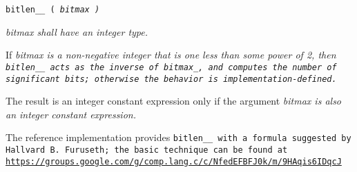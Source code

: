 
\tt{bitlen__ (} \it{bitmax} \tt{)}


\it{bitmax} shall have an integer type.


If \it{bitmax} is a non-negative integer that is one less than some power of 2,
then \tt{bitlen__} acts as the inverse of \tt{bitmax_}, and computes the number
of significant bits; otherwise the behavior is implementation-defined.

The result is an integer constant expression only if the
argument \it{bitmax} is also an integer constant expression.

\note The reference implementation provides \tt{bitlen__} with a formula
suggested by Hallvard B. Furuseth; the basic technique can be found at
\url{https://groups.google.com/g/comp.lang.c/c/NfedEFBFJ0k/m/9HAqis6IDqcJ}

